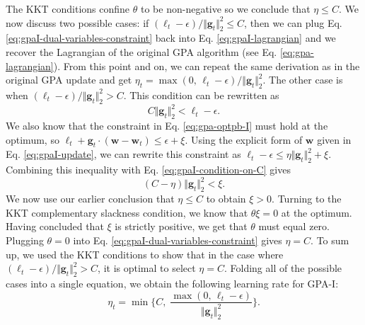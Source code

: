 The KKT conditions confine $\theta$ to be non-negative so we conclude that $\eta \leq C$. We now discuss two possible cases: if $(\ell_t-\epsilon) / \Vert\mathbf{g}_t\Vert_2^2 \leq C$, then we can plug Eq. \eqref{eq:gpaI-dual-variables-constraint} back into Eq. \eqref{eq:gpaI-lagrangian} and we recover the Lagrangian of the original GPA algorithm (see Eq. \eqref{eq:gpa-lagrangian}). From this point and on, we can repeat the same derivation as in the original GPA update and get $\eta_t = \max(0,\,\ell_t-\epsilon) / \Vert\mathbf{g}_t\Vert_2^2$. The other case is when $(\ell_t-\epsilon) / \Vert\mathbf{g}_t\Vert_2^2 > C$. This condition can be rewritten as
\begin{equation}
\label{eq:gpaI-condition-on-C}
	C\Vert\mathbf{g}_t\Vert_2^2 < \ell_t-\epsilon.
\end{equation}
We also know that the constraint in Eq. \eqref{eq:gpa-optpb-I} must hold at the optimum, so $\ell_t + \mathbf{g}_t\cdot(\mathbf{w} - \mathbf{w}_t) \leq \epsilon + \xi$. Using the explicit form of $\mathbf{w}$ given in Eq. \eqref{eq:gpaI-update}, we can rewrite this constraint as $\ell_t - \epsilon \leq \eta\Vert\mathbf{g}_t\Vert_2^2 + \xi$. Combining this inequality with Eq. \eqref{eq:gpaI-condition-on-C} gives
\begin{equation}
	(C - \eta)\Vert\mathbf{g}_t\Vert_2^2 < \xi.
\end{equation}
We now use our earlier conclusion that $\eta \leq C$ to obtain $\xi > 0$. Turning to the KKT complementary slackness condition, we know that $\theta\xi = 0$ at the optimum. Having concluded that $\xi$ is strictly positive, we get that $\theta$ must equal zero. Plugging $\theta = 0$ into Eq. \eqref{eq:gpaI-dual-variables-constraint} gives $\eta = C$. To sum up, we used the KKT conditions to show that in the case where $(\ell_t - \epsilon) / \Vert\mathbf{g}_t\Vert_2^2 > C$, it is optimal to select $\eta = C$. Folding all of the possible cases into a single equation, we obtain the following learning rate for GPA-I:
\begin{equation}
	\eta_t = \min\bigg\{C, \; \frac{\max(0,\,\ell_t - \epsilon)}{\Vert\mathbf{g}_t\Vert_2^2}\bigg\}.
\end{equation}

